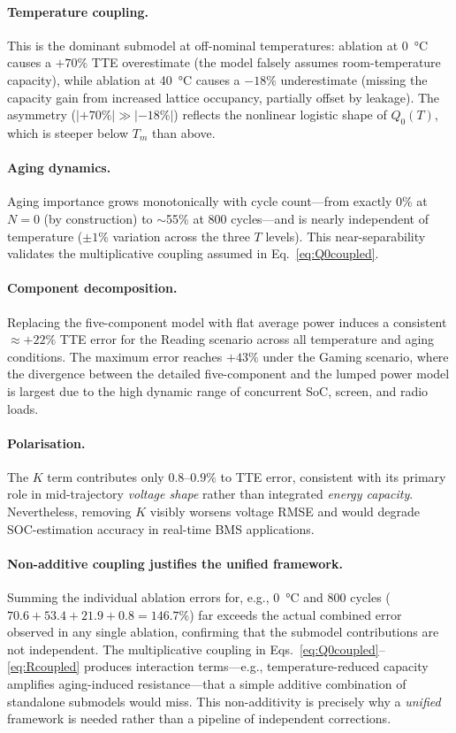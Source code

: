 \documentclass[5p,times,number]{elsarticle}
\newcommand{\eqnref}[1]{\textcolor{supercolor}{Eq.~\eqref{#1}}}
\newcommand{\eqnsref}[2]{\textcolor{supercolor}{Eqs.~\eqref{#1}--\eqref{#2}}}
\begin{document}
\paragraph{Temperature coupling.}
This is the dominant submodel at off-nominal temperatures: ablation at \SI{0}{\degreeCelsius} causes a $+70\%$ TTE overestimate (the model falsely assumes room-temperature capacity), while ablation at \SI{40}{\degreeCelsius} causes a $-18\%$ underestimate (missing the capacity gain from increased lattice occupancy, partially offset by leakage).
The asymmetry ($|+70\%| \gg |-18\%|$) reflects the nonlinear logistic shape of $Q_0(T)$, which is steeper below $T_m$ than above.

\paragraph{Aging dynamics.}
Aging importance grows monotonically with cycle count---from exactly 0\% at $N=0$ (by construction) to $\sim$55\% at 800 cycles---and is nearly independent of temperature ($\pm 1\%$ variation across the three $T$ levels).
This near-separability validates the multiplicative coupling assumed in \eqnref{eq:Q0coupled}.

\paragraph{Component decomposition.}
Replacing the five-component model with flat average power induces a consistent $\approx +22\%$ TTE error for the Reading scenario across all temperature and aging conditions.
The maximum error reaches $+43\%$ under the Gaming scenario, where the divergence between the detailed five-component and the lumped power model is largest due to the high dynamic range of concurrent SoC, screen, and radio loads.

\paragraph{Polarisation.}
The $K$ term contributes only $0.8$--$0.9\%$ to TTE error, consistent with its primary role in mid-trajectory \emph{voltage shape} rather than integrated \emph{energy capacity}.
Nevertheless, removing $K$ visibly worsens voltage RMSE and would degrade SOC-estimation accuracy in real-time BMS applications.

\paragraph{Non-additive coupling justifies the unified framework.}
Summing the individual ablation errors for, e.g., \SI{0}{\degreeCelsius} and 800 cycles ($70.6 + 53.4 + 21.9 + 0.8 = 146.7\%$) far exceeds the actual combined error observed in any single ablation, confirming that the submodel contributions are not independent.
The multiplicative coupling in \eqnsref{eq:Q0coupled}{eq:Rcoupled} produces interaction terms---e.g., temperature-reduced capacity amplifies aging-induced resistance---that a simple additive combination of standalone submodels would miss.
This non-additivity is precisely why a \emph{unified} framework is needed rather than a pipeline of independent corrections.
\end{document}
